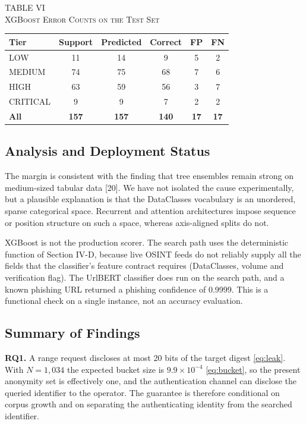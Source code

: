 \documentclass[10pt,twocolumn]{article}
\newcommand{\tcap}[2]{\begin{center}\footnotesize TABLE #1\\[1pt]\scshape #2\end{center}\vspace{-8pt}}
\newcommand{\tnote}[1]{\par\vspace{2pt}{\footnotesize #1\par}}
\begin{document}
\begin{table}[!t]
\centering
\tcap{VI}{XGBoost Error Counts on the Test Set}
\footnotesize
\begin{tabular}{|l|c|c|c|c|c|}
\hline
\textbf{Tier} & \textbf{Support} & \textbf{Predicted} & \textbf{Correct} & \textbf{FP} & \textbf{FN}\\
\hline
LOW & 11 & 14 & 9 & 5 & 2\\
\hline
MEDIUM & 74 & 75 & 68 & 7 & 6\\
\hline
HIGH & 63 & 59 & 56 & 3 & 7\\
\hline
CRITICAL & 9 & 9 & 7 & 2 & 2\\
\hline
\textbf{All} & \textbf{157} & \textbf{157} & \textbf{140} & \textbf{17} & \textbf{17}\\
\hline
\end{tabular}
\tnote{FP: false positives; FN: false negatives. Derived from per-class precision, recall and support.}
\end{table}

\subsection{Analysis and Deployment Status}

The margin is consistent with the finding that tree ensembles remain strong on medium-sized tabular data [20]. We have not isolated the cause experimentally, but a plausible explanation is that the DataClasses vocabulary is an unordered, sparse categorical space. Recurrent and attention architectures impose sequence or position structure on such a space, whereas axis-aligned splits do not.

XGBoost is not the production scorer. The search path uses the deterministic function of Section IV-D, because live OSINT feeds do not reliably supply all the fields that the classifier's feature contract requires (DataClasses, volume and verification flag). The UrlBERT classifier does run on the search path, and a known phishing URL returned a phishing confidence of 0.9999. This is a functional check on a single instance, not an accuracy evaluation.

\subsection{Summary of Findings}

\textbf{RQ1.} A range request discloses at most 20 bits of the target digest \eqref{eq:leak}. With $N=1{,}034$ the expected bucket size is $9.9\times10^{-4}$ \eqref{eq:bucket}, so the present anonymity set is effectively one, and the authentication channel can disclose the queried identifier to the operator. The guarantee is therefore conditional on corpus growth and on separating the authenticating identity from the searched identifier.
\end{document}
